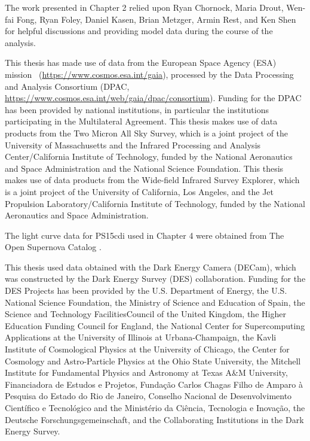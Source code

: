 The work presented in Chapter 2 relied upon Ryan Chornock, Maria Drout, Wen-fai Fong, Ryan Foley, Daniel Kasen, Brian Metzger, Armin Rest, and Ken Shen for helpful discussions and providing model data during the course of the analysis.

This thesis has made use of data from the European Space Agency (ESA) mission \gaia\ (\url{https://www.cosmos.esa.int/gaia}), processed by the \gaia Data Processing and Analysis Consortium (DPAC, \url{https://www.cosmos.esa.int/web/gaia/dpac/consortium}). Funding for the DPAC has been provided by national institutions, in particular the institutions participating in the \gaia Multilateral Agreement. This thesis makes use of data products from the Two Micron All Sky Survey, which is a joint project of the University of Massachusetts and the Infrared Processing and Analysis Center/California Institute of Technology, funded by the National Aeronautics and Space Administration and the National Science Foundation. This thesis makes use of data products from the Wide-field Infrared Survey Explorer, which is a joint project of the University of California, Los Angeles, and the Jet Propulsion Laboratory/California Institute of Technology, funded by the National Aeronautics and Space Administration.

The light curve data for PS15cdi used in Chapter 4 were obtained from The Open Supernova
Catalog \citep{Guillochon+17}.

This thesis used data obtained with the Dark Energy Camera (DECam), which was constructed by the Dark Energy Survey (DES) collaboration. Funding for the DES Projects has been provided by the U.S. Department of Energy, the U.S. National Science Foundation, the Ministry of Science and Education of Spain, the Science and Technology FacilitiesCouncil of the United Kingdom, the Higher Education Funding Council for England, the National Center for Supercomputing Applications at the University of Illinois at Urbana-Champaign, the Kavli Institute of Cosmological Physics at the University of Chicago, the Center for Cosmology and Astro-Particle Physics at the Ohio State University, the Mitchell Institute for Fundamental Physics and Astronomy at Texas A\&M University, Financiadora de Estudos e Projetos, Funda{\c c}{\~a}o Carlos Chagas Filho de Amparo {\`a} Pesquisa do Estado do Rio de Janeiro, Conselho Nacional de Desenvolvimento Cient{\'i}fico e Tecnol{\'o}gico and the Minist{\'e}rio da Ci{\^e}ncia, Tecnologia e Inova{\c c}{\~a}o, the Deutsche Forschungsgemeinschaft, and the Collaborating Institutions in the Dark Energy Survey.

